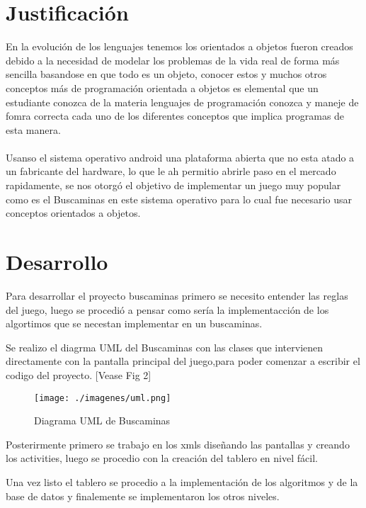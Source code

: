 \documentclass[11pt]{article} %
\begin{document}
\section{\fontsize{14}{0} \bf Justificación}

En la evolución de los lenguajes tenemos los orientados a objetos fueron creados debido a la necesidad de modelar los problemas de la vida real de forma más sencilla basandose en que todo es un objeto, conocer estos y muchos otros conceptos más de programación orientada a objetos es elemental que un estudiante conozca de la materia lenguajes de programación conozca y maneje de fomra correcta cada uno de los diferentes conceptos que implica programas de esta manera. \\ \\


Usanso el sistema operativo android  una plataforma abierta que no esta atado a un fabricante del hardware, lo que le ah permitio abrirle paso en el mercado rapidamente, se nos otorgó el objetivo de implementar un juego muy popular como es el Buscaminas en este sistema operativo para lo cual fue necesario usar conceptos orientados a objetos.\\


\newpage
\section{\fontsize{14}{0} \bf Desarrollo}
Para desarrollar el proyecto buscaminas primero se necesito entender las reglas del juego, luego se procedió a pensar como sería la implementacción de los algortimos que se necestan implementar en un buscaminas.

Se realizo el diagrma UML del Buscaminas con las clases que intervienen directamente con la pantalla principal del juego,para poder comenzar a escribir el codigo del proyecto. [Vease Fig 2]

\begin{figure}[h]
\centering
 \texttt{[image: ./imagenes/uml.png]}
\caption{Diagrama UML de Buscaminas}\label{Fig:Diagrama UML}
\end{figure}

Posterirmente primero se trabajo en los xmls diseñando las pantallas y creando los activities, luego se procedio con la creación del tablero en nivel fácil.

Una vez listo el tablero se procedio a la implementación de los algoritmos y de la base de datos y finalemente se implementaron los otros niveles.
\end{document}
